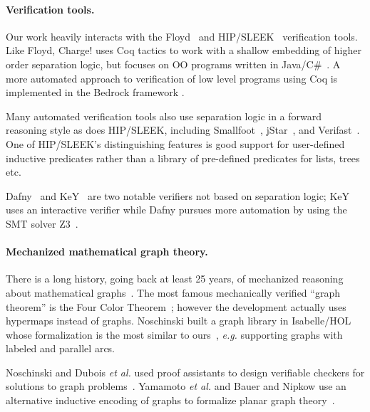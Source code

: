 \paragraph{Verification tools.}
Our work heavily interacts with the Floyd~\cite{appel:programlogics} and HIP/SLEEK~\cite{chin:hipsleek} verification tools.  Like Floyd, Charge! uses Coq tactics to work with a shallow embedding of higher order separation logic, but focuses on OO programs written in Java/C\#~\cite{bengtson:charge}.  A  more automated approach to verification of low level programs using Coq is implemented in the Bedrock framework \cite{chlipala:bedrock}.

Many automated verification tools also use separation logic in a forward reasoning style as does HIP/SLEEK, including Smallfoot~\cite{berdine:smallfoot}, jStar~\cite{DistefanoP08}, and Verifast~\cite{jacobs:verifast}.  One of HIP/SLEEK's distinguishing features is good support for user-defined inductive predicates rather than a library of pre-defined predicates for lists, trees etc.

Dafny~\cite{Leino10} and KeY~\cite{Beckert:2007} are two notable verifiers not based on separation logic; KeY uses an interactive verifier while Dafny pursues more automation by using the SMT solver Z3~\cite{Moura2008}.

\paragraph{Mechanized mathematical graph theory.} There is a long history,
going back at least 25 years, of mechanized reasoning about mathematical
graphs~\cite{wong1991}.  The most famous mechanically verified ``graph theorem''
is the Four Color Theorem~\cite{gonthier2005computer}; however
the development actually uses hypermaps instead of graphs.
Noschinski built a graph library in Isabelle/HOL whose formalization
is the most similar to ours~\cite{Noschinski2015}, \emph{e.g.} supporting
graphs with labeled and parallel arcs.

Noschinski and Dubois \emph{et al.} used proof assistants to design verifiable
checkers for solutions to graph problems~\cite{noschinski2015formalizing,dubois2015graphes}.
Yamamoto \emph{et al.} and Bauer and Nipkow use an alternative inductive
encoding of graphs to formalize planar graph theory~\cite{yamamoto1995formalization,bauer20025}.




